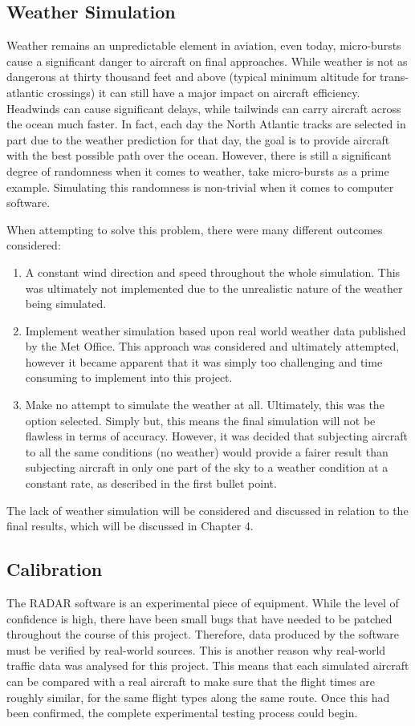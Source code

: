 \documentclass[stu, a4paper, 12pt, floatsintext]{apa7}
\numberwithin{figure}{section}
\numberwithin{table}{section}
\numberwithin{equation}{section}
\begin{document}
\subsection{Weather Simulation}
Weather remains an unpredictable element in aviation, even today, micro-bursts cause a significant danger to aircraft on final approaches. While weather is not as dangerous at thirty thousand feet and above (typical minimum altitude for trans-atlantic crossings) it can still have a major impact on aircraft efficiency. Headwinds can cause significant delays, while tailwinds can carry aircraft across the ocean much faster. In fact, each day the North Atlantic tracks are selected in part due to the weather prediction for that day, the goal is to provide aircraft with the best possible path over the ocean. However, there is still a significant degree of randomness when it comes to weather, take micro-bursts as a prime example. Simulating this randomness is non-trivial when it comes to computer software. 

When attempting to solve this problem, there were many different outcomes considered:
\begin{enumerate}
    \item A constant wind direction and speed throughout the whole simulation. This was ultimately not implemented due to the unrealistic nature of the weather being simulated. 
    \item Implement weather simulation based upon real world weather data published by the Met Office. This approach was considered and ultimately attempted, however it became apparent that it was simply too challenging and time consuming to implement into this project.
    \item Make no attempt to simulate the weather at all. Ultimately, this was the option selected. Simply but, this means the final simulation will not be flawless in terms of accuracy. However, it was decided that subjecting aircraft to all the same conditions (no weather) would provide a fairer result than subjecting aircraft in only one part of the sky to a weather condition at a constant rate, as described in the first bullet point. 
\end{enumerate}
The lack of weather simulation will be considered and discussed in relation to the final results, which will be discussed in Chapter 4. 
\subsection{Calibration}
The RADAR software is an experimental piece of equipment. While the level of confidence is high, there have been small bugs that have needed to be patched throughout the course of this project. Therefore, data produced by the software must be verified by real-world sources. This is another reason why real-world traffic data was analysed for this project. This means that each simulated aircraft can be compared with a real aircraft to make sure that the flight times are roughly similar, for the same flight types along the same route. Once this had been confirmed, the complete experimental testing process could begin. 
\end{document}
